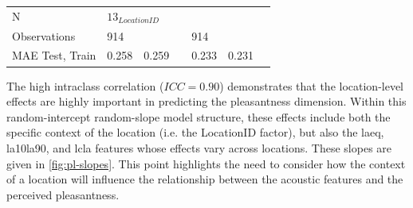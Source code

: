 \begin{table}[h!]
\begin{tabular}{@{}l|lccccc@{}}
    N                                        & \multicolumn{6}{l}{$13_{LocationID}$}                                                                                                                   \\
    Observations                             &
    914                                      &
    \multicolumn{1}{l}{}                     &
    \multicolumn{1}{l}{}                     &
    \multicolumn{1}{l}{914}                  &
    \multicolumn{1}{l}{}                     &
    \multicolumn{1}{l}{}                                                                                                                                                                               \\

    MAE Test, Train                          &
    0.258                                    &
    0.259                                    &
                                             &
    \multicolumn{1}{l}{0.233}                &
    0.231                                                                                                                                                                                              \\

    \bottomrule
  \end{tabular}
\end{table}

   The high intraclass correlation ($ICC=0.90$) demonstrates that the location-level effects are highly important in predicting the pleasantness dimension. Within this random-intercept random-slope model structure, these effects include both the specific context of the location (i.e. the LocationID factor), but also the \gls{laeq}, \gls{la10la90}, and \gls{lcla} features whose effects vary across locations. These slopes are given in \cref{fig:pl-slopes}. This point highlights the need to consider how the context of a location will influence the relationship between the acoustic features and the perceived pleasantness.

